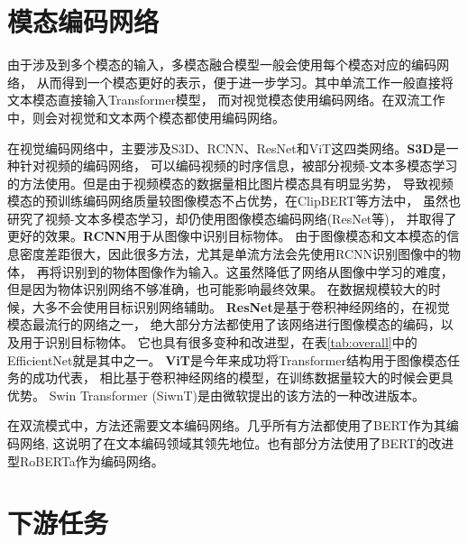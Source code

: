 \section{模态编码网络}\label{sec:backbone}

由于涉及到多个模态的输入，多模态融合模型一般会使用每个模态对应的编码网络，
从而得到一个模态更好的表示，便于进一步学习。其中单流工作一般直接将文本模态直接输入Transformer模型，
而对视觉模态使用编码网络。在双流工作中，则会对视觉和文本两个模态都使用编码网络。

在视觉编码网络中，主要涉及S3D、RCNN、ResNet和ViT这四类网络。\textbf{S3D}\cite{xie2018rethinking}是一种针对视频的编码网络，
可以编码视频的时序信息，被部分视频-文本多模态学习的方法使用。但是由于视频模态的数据量相比图片模态具有明显劣势，
导致视频模态的预训练编码网络质量较图像模态不占优势，在ClipBERT\cite{clipbert}等方法中，
虽然也研究了视频-文本多模态学习，却仍使用图像模态编码网络(ResNet等)，
并取得了更好的效果。\textbf{RCNN}\cite{ren2015faster}用于从图像中识别目标物体。
由于图像模态和文本模态的信息密度差距很大，因此很多方法，尤其是单流方法会先使用RCNN识别图像中的物体，
再将识别到的物体图像作为输入。这虽然降低了网络从图像中学习的难度，
但是因为物体识别网络不够准确，也可能影响最终效果。
在数据规模较大的时候，大多不会使用目标识别网络辅助。
\textbf{ResNet}\cite{he2015deep}是基于卷积神经网络的，在视觉模态最流行的网络之一，
绝大部分方法都使用了该网络进行图像模态的编码，以及用于识别目标物体。
它也具有很多变种和改进型，在表\ref{tab:overall}中的EfficientNet就是其中之一。
\textbf{ViT}\cite{dosovitskiy2020image}是今年来成功将Transformer结构用于图像模态任务的成功代表，
相比基于卷积神经网络的模型，在训练数据量较大的时候会更具优势。
Swin Transformer (SiwnT)\cite{liu2021swin}是由微软提出的该方法的一种改进版本。

在双流模式中，方法还需要文本编码网络。几乎所有方法都使用了BERT\cite{devlin2019bert}作为其编码网络,
这说明了在文本编码领域其领先地位。也有部分方法使用了BERT的改进型RoBERTa\cite{liu2019roberta}作为编码网络。

\section{下游任务}\label{sec:downstream}

